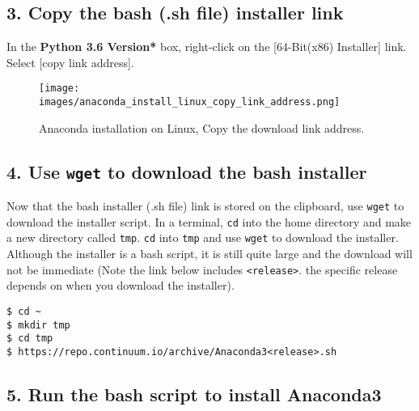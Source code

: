 \documentclass{book}
\makeatletter
\def\maxwidth{\ifdim\Gin@nat@width>\linewidth\linewidth
\else\Gin@nat@width\fi}
\let\Oldincludegraphics\includegraphics
\renewcommand{\includegraphics}[1]{\Oldincludegraphics[width=.8\maxwidth]{#1}}
\newcommand{\passthrough}[1]{#1}
\makeatother
\begin{document}
    
        \hypertarget{copy-the-bash-.sh-file-installer-link}{%
\subsection{3. Copy the bash (.sh file) installer
link}\label{copy-the-bash-.sh-file-installer-link}}

In the \textbf{Python 3.6 Version* } box, right-click on the
{[}64-Bit(x86) Installer{]} link. Select {[}copy link address{]}.

\begin{figure}
\centering
\texttt{[image: images/anaconda\_install\_linux\_copy\_link\_address.png]}
\caption{Anaconda installation on Linux, Copy the download link
address.}
\end{figure}
    




    
        \hypertarget{use-wget-to-download-the-bash-installer}{%
\subsection{\texorpdfstring{4. Use \texttt{wget} to download the bash
installer}{4. Use wget to download the bash installer}}\label{use-wget-to-download-the-bash-installer}}

Now that the bash installer (.sh file) link is stored on the clipboard,
use \passthrough{\lstinline!wget!} to download the installer script. In
a terminal, \passthrough{\lstinline!cd!} into the home directory and
make a new directory called \passthrough{\lstinline!tmp!}.
\passthrough{\lstinline!cd!} into \passthrough{\lstinline!tmp!} and use
\passthrough{\lstinline!wget!} to download the installer. Although the
installer is a bash script, it is still quite large and the download
will not be immediate (Note the link below includes
\passthrough{\lstinline!<release>!}. the specific release depends on
when you download the installer).

\begin{lstlisting}
$ cd ~
$ mkdir tmp
$ cd tmp
$ https://repo.continuum.io/archive/Anaconda3<release>.sh
\end{lstlisting}
    




    
        \hypertarget{run-the-bash-script-to-install-anaconda3}{%
\subsection{\texorpdfstring{5. Run the bash script to install
\textbf{Anaconda3}}{5. Run the bash script to install Anaconda3}}\label{run-the-bash-script-to-install-anaconda3}}
\end{document}
